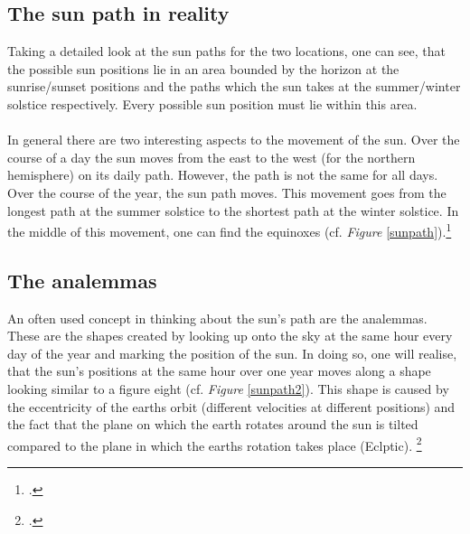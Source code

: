 \documentclass[a4paper,9pt]{article}
\begin{document}
\begin{multicols}{2}
\subsection{The sun path in reality}

Taking a detailed look at the  sun paths for the two locations, one can see, that the possible sun positions lie in an area bounded by the horizon at the sunrise/sunset positions and the paths which the sun takes at the summer/winter solstice respectively. Every possible sun position must lie within this area.\\
\\
In general there are two interesting aspects to the movement of the sun. Over the course of a day the sun moves from the east to the west (for the northern hemisphere) on its daily path. However, the path is not the same for all days. Over the course of the year, the sun path moves. This movement goes from the longest path at the summer solstice to the shortest path at the winter solstice. In the middle of this movement, one can find the equinoxes (cf. \textit{Figure} \ref{sunpath}).\footcite{sunpath}
\columnbreak

\subsection{The analemmas}\label{anannn}

An often used concept in thinking about the sun's path are the analemmas. These are the shapes created by looking up onto the sky at the same hour every day of the year and marking the position of the sun. In doing so, one will realise, that the sun's positions at the same hour over one year moves along a shape looking similar to a figure eight (cf. \textit{Figure} \ref{sunpath2}). This shape is caused by the eccentricity of the earths orbit (different velocities at different positions) and the fact that the plane on which the earth rotates around the sun is tilted compared to the plane in which the earths rotation takes place (Eclptic). \footcite{analemma}

\end{multicols}
\end{document}
